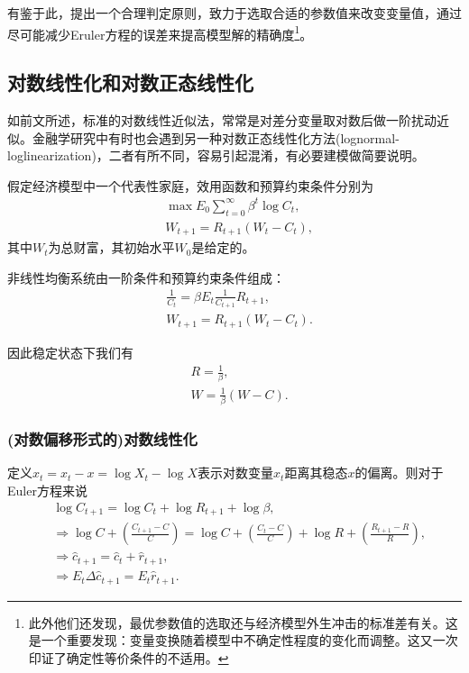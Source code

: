 有鉴于此，\cite{FernandezVillaverde:2006hr}提出一个合理判定原则，致力于选取合适的参数值来改变变量值，通过尽可能减少Eruler方程的误差来提高模型解的精确度\footnote{此外他们还发现，最优参数值的选取还与经济模型外生冲击的标准差有关。这是一个重要发现：变量变换随着模型中不确定性程度的变化而调整。这又一次印证了确定性等价条件的不适用。}。

\subsection{对数线性化和对数正态线性化}
如前文所述，标准的对数线性近似法，常常是对差分变量取对数后做一阶扰动近似。金融学研究中有时也会遇到另一种对数正态线性化方法(lognormal-loglinearization)，二者有所不同，容易引起混淆，有必要建模做简要说明。

假定经济模型中一个代表性家庭，效用函数和预算约束条件分别为
\begin{equation*}
  \begin{split}
    &\max E_0 \sum_{t=0}^{\infty} \beta^t \log C_t, \\
    &W_{t+1} = R_{t+1} (W_t - C_t),
  \end{split}
\end{equation*}
其中$W_t$为总财富，其初始水平$W_0$是给定的。

非线性均衡系统由一阶条件和预算约束条件组成：
\begin{align*}
      &\frac{1}{C_{t}} = \beta E_t \frac{1}{C_{t+1}} R_{t+1},\\
      &W_{t+1} = R_{t+1} \left( W_t - C_t \right).
\end{align*}


因此稳定状态下我们有
\begin{equation*}
  \begin{split}
    &R = \frac{1}{\beta}, \\
    &W = \frac{1}{\beta} (W - C).
  \end{split}
\end{equation*}

\subsubsection{(对数偏移形式的)对数线性化}
定义$\hat{x}_t = x_t - x = \log X_t - \log X$表示对数变量$x_t$距离其稳态$x$的偏离。则对于Euler方程来说
\begin{equation*}
  \begin{split}
    &\log C_{t+1} = \log C_t + \log R_{t+1} + \log \beta, \\
     & \Rightarrow \log C + \left( \frac{C_{t+1} - C}{C} \right) = \log C + \left( \frac{C_{t} - C}{C} \right) + \log R + \left( \frac{R_{t+1} - R}{R} \right), \\
     & \Rightarrow \hat{c}_{t+1} = \hat{c}_{t} + \hat{r}_{t+1}, \\
     & \Rightarrow E_t \Delta \hat{c}_{t+1} = E_t \hat{r}_{t+1}.
  \end{split}
\end{equation*}

